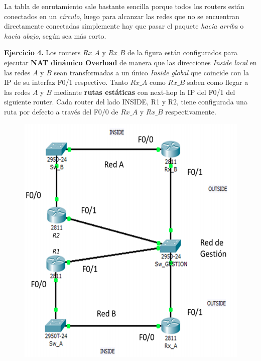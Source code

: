 \documentclass[12pt]{article}
\theoremstyle{definition}
\theoremstyle{remark}
\begin{document}
La tabla de enrutamiento sale bastante sencilla porque todos los routers están conectados en un \textit{círculo}, luego para alcanzar las redes que no se encuentran directamente conectadas simplemente hay que pasar el paquete \textit{hacia arriba} o \textit{hacia abajo}, según sea más corto.


\newpage

\textbf{Ejercicio 4.} Los routers $Rx\_A$ y $Rx\_B$ de la figura están configurados para ejecutar \textbf{NAT dinámico Overload} de manera que las direcciones \textit{Inside local} en las redes $A$ y $B$ sean transformadas a un único \textit{Inside global} que coincide con la IP de su interfaz F0/1 respectivo. Tanto $Rx\_A$ como $Rx\_B$ saben como llegar a las redes $A$ y $B$ mediante \textbf{rutas estáticas} con next-hop la IP del F0/1 del siguiente router. Cada router del lado INSIDE, R1 y R2, tiene configurada una ruta por defecto a través del F0/0 de $Rx\_A$ y $Rx\_B$ respectivamente.
\begin{figure}[H]
   \center
  \includegraphics[scale=0.25]{img/4.png}
\end{figure}
\end{document}
